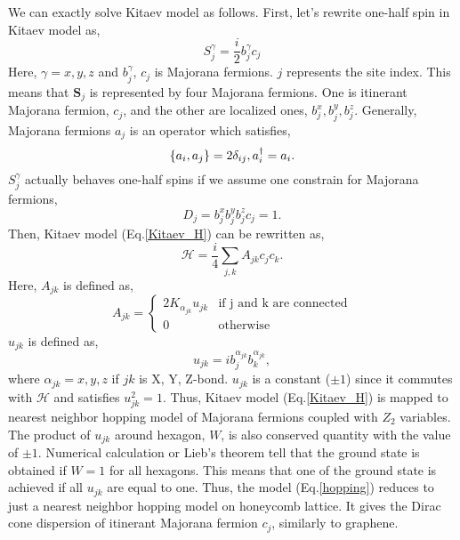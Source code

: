 We can exactly solve Kitaev model as follows.
First, let's rewrite one-half spin in Kitaev model as,
\begin{equation}
S^\gamma_j = \frac{i}{2}b^\gamma_jc_j
\end{equation}
Here, $\gamma = x,y,z$ and $b^\gamma_j$, $c_j$ is Majorana fermions.
$j$ represents the site index.
This means that $\bm{S}_j$ is represented by four Majorana fermions.
One is itinerant Majorana fermion, $c_j$, and the other are localized ones, $b^x_j, b^y_j, b^z_j$.
Generally, Majorana fermions $a_j$ is an operator which satisfies,
\begin{equation}
\{a_i, a_j\} = 2\delta_{ij}, \vspace{4mm} a^\dag_i = a_i.
\end{equation}
$S^\gamma_j$ actually behaves one-half spins if we assume one constrain for Majorana fermions,
\begin{equation}
D_j = b^x_jb^y_jb^z_jc_j = 1.
\end{equation}
Then, Kitaev model (Eq.\ref{Kitaev_H}) can be rewritten as,
\begin{equation}
\mathcal{H} = \frac{i}{4}\sum_{j,k}A_{jk}c_jc_k.
\label{hopping}
\end{equation}
Here, $A_{jk}$ is defined as,
\begin{equation}
A_{jk} = \begin{cases}
2K_{\alpha_{jk}}u_{jk} & \text{if j and k are connected}\\
0 & \text{otherwise}
\end{cases}
\end{equation}
$u_{jk}$ is defined as,
\begin{equation}
u_{jk} = ib^{\alpha_{jk}}_jb^{\alpha_{jk}}_k,
\end{equation}
where $\alpha_{jk} = x, y, z$ if $jk$ is X, Y, Z-bond.
$u_{jk}$ is a constant ($\pm 1$) since it commutes with $\mathcal{H}$ and satisfies $u^2_{jk} = 1$.
Thus, Kitaev model (Eq.\ref{Kitaev_H}) is mapped to nearest neighbor hopping model of Majorana fermions coupled with $Z_2$ variables.
The product of $u_{jk}$ around hexagon, $W$, is also conserved quantity with the value of $\pm1$.
Numerical calculation or Lieb's theorem \cite{kitaev2006anyons} tell that the ground state is obtained if $W = 1$ for all hexagons.
This means that one of the ground state is achieved if all $u_{jk}$ are equal to one.
Thus, the model (Eq.\ref{hopping}) reduces to just a nearest neighbor hopping model on honeycomb lattice.
It gives the Dirac cone dispersion of itinerant Majorana fermion $c_j$, similarly to graphene.

